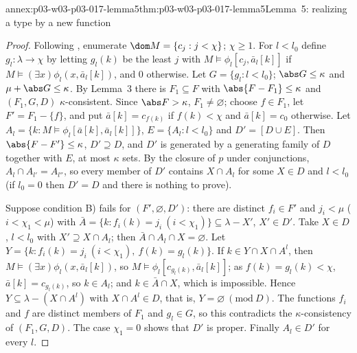 \begin{annexitem}{annex:p03-w03-p03-017-lemma5}{thm:p03-w03-p03-017-lemma5}{Lemma~5: realizing a type by a new function}
\begin{proof}
Following \cite[pp.~229--230]{Shelah1971Ultrapowers}, enumerate
\(\dom M=\{c_j:j<\chi\}\); \(\chi\ge1\).  For \(l<l_0\) define
\(g_l:\lambda\to\chi\) by letting \(g_l(k)\) be the least \(j\) with
\(M\models\phi_l[c_j,\bar a_l[k]]\) if
\(M\models(\exists x)\phi_l(x,\bar a_l[k])\), and \(0\) otherwise.  Let
\(G=\{g_l:l<l_0\}\); \(\abs G\le\kappa\) and \(\mu+\abs G\le\kappa\).  By
Lemma~3 there is \(F_1\subseteq F\) with \(\abs{F-F_1}\le\kappa\) and
\((F_1,G,D)\) \(\kappa\)-consistent.  Since \(\abs F>\kappa\), \(F_1\neq\varnothing\);
choose \(f\in F_1\), let \(F'=F_1-\{f\}\), and put
\(\bar a[k]=c_{f(k)}\) if \(f(k)<\chi\) and \(\bar a[k]=c_0\) otherwise.  Let
\(A_l=\{k:M\models\phi_l[\bar a[k],\bar a_l[k]]\}\),
\(E=\{A_l:l<l_0\}\) and \(D'=[D\cup E]\).  Then \(\abs{F-F'}\le\kappa\),
\(D'\supseteq D\), and \(D'\) is generated by a generating family of \(D\)
together with \(E\), at most \(\kappa\) sets.  By the closure of \(p\) under
conjunctions, \(A_l\cap A_{l'}=A_{l''}\), so every member of \(D'\) contains
\(X\cap A_l\) for some \(X\in D\) and \(l<l_0\) (if \(l_0=0\) then \(D'=D\)
and there is nothing to prove).

Suppose condition B) fails for \((F',\varnothing,D')\): there are distinct
\(f_i\in F'\) and \(j_i<\mu\) (\(i<\chi_1<\mu\)) with
\(\bar A=\{k:f_i(k)=j_i\ (i<\chi_1)\}\subseteq\lambda-X'\), \(X'\in D'\).  Take
\(X\in D\), \(l<l_0\) with \(X'\supseteq X\cap A_l\); then
\(\bar A\cap A_l\cap X=\varnothing\).  Let
\(Y=\{k:f_i(k)=j_i\ (i<\chi_1),\ f(k)=g_l(k)\}\).  If \(k\in Y\cap X\cap A^l\),
then \(M\models(\exists x)\phi_l(x,\bar a_l[k])\), so
\(M\models\phi_l[c_{g_l(k)},\bar a_l[k]]\); as \(f(k)=g_l(k)<\chi\),
\(\bar a[k]=c_{g_l(k)}\), so \(k\in A_l\); and \(k\in\bar A\cap X\), which is
impossible.  Hence \(Y\subseteq\lambda-(X\cap A^l)\) with \(X\cap A^l\in D\),
that is, \(Y=\varnothing\ (\mathrm{mod}\ D)\).  The functions \(f_i\) and
\(f\) are distinct members of \(F_1\) and \(g_l\in G\), so this contradicts
the \(\kappa\)-consistency of \((F_1,G,D)\).  The case \(\chi_1=0\) shows that
\(D'\) is proper.  Finally \(A_l\in D'\) for every \(l\).
\end{proof}
\end{annexitem}

